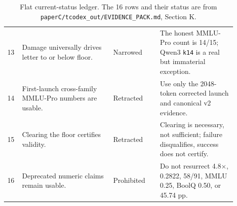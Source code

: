 \begin{table}[p]
\begin{tabular}{p{0.05\linewidth}p{0.37\linewidth}p{0.19\linewidth}p{0.31\linewidth}}
13 & Damage universally drives letter to or below floor. & Narrowed & The honest MMLU-Pro count is 14/15; Qwen3 \texttt{k14} is a real but immaterial exception. \\
14 & First-launch cross-family MMLU-Pro numbers are usable. & Retracted & Use only the 2048-token corrected launch and canonical v2 evidence. \\
15 & Clearing the floor certifies validity. & Retracted & Clearing is necessary, not sufficient; failure disqualifies, success does not certify. \\
16 & Deprecated numeric claims remain usable. & Prohibited & Do not resurrect 4.8$\times$, 0.2822, 58/91, MMLU 0.25, BoolQ 0.50, or 45.74 pp. \\
\bottomrule
\end{tabular}
\caption{Flat current-status ledger. The 16 rows and their status are from \texttt{paperC/tcodex\_out/EVIDENCE\_PACK.md}, Section K.}
\label{tab:claims}
\end{table}
